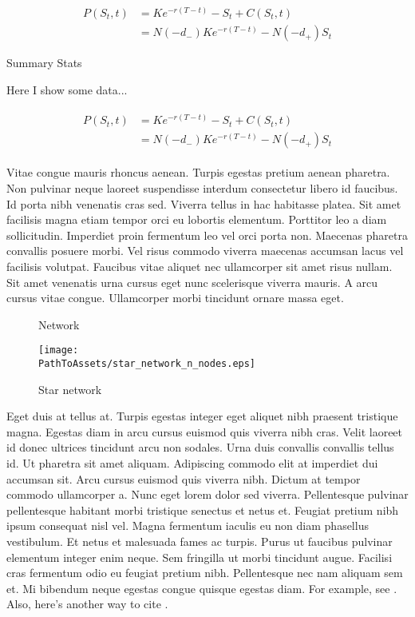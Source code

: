 \documentclass[12pt]{article}
\begin{document}
\begin{align}
P(S_t, t) &= Ke^{-r(T - t)} - S_t + C(S_t, t)   \label{eq:align1}\\
          &= N(-d_-) Ke^{-r(T - t)} - N(-d_+) S_t \label{eq:align2}
\end{align}



\begin{table}
\caption{Summary Stats}
\centering

\caption*{
  Here I show some data...
}
\label{table:example_table.tex}
\end{table}

\begin{align}
\begin{split}
P(S_t, t) &= Ke^{-r(T - t)} - S_t + C(S_t, t)   \\
          &= N(-d_-) Ke^{-r(T - t)} - N(-d_+) S_t 
\end{split}
\label{eq:align-share}
\end{align}



Vitae congue mauris rhoncus aenean. Turpis egestas pretium aenean pharetra.
Non pulvinar neque laoreet suspendisse interdum consectetur libero id
faucibus. Id porta nibh venenatis cras sed. Viverra tellus in hac habitasse
platea. Sit amet facilisis magna etiam tempor orci eu lobortis elementum.
Porttitor leo a diam sollicitudin. Imperdiet proin fermentum leo vel orci
porta non. Maecenas pharetra convallis posuere morbi. Vel risus commodo
viverra maecenas accumsan lacus vel facilisis volutpat. Faucibus vitae
aliquet nec ullamcorper sit amet risus nullam. Sit amet venenatis urna cursus
eget nunc scelerisque viverra mauris. A arcu cursus vitae congue. Ullamcorper
morbi tincidunt ornare massa eget.

\begin{figure}
\centering
\captionsetup{width=0.8\textwidth}
\caption{Network}
  \centering
  \texttt{[image: \\PathToAssets/star\_network\_n\_nodes.eps]}
\caption*{
  Star network
  }
\label{fig:star_network_n_nodes.eps}
\end{figure}


Eget duis at tellus at. Turpis egestas integer eget aliquet nibh praesent
tristique magna. Egestas diam in arcu cursus euismod quis viverra nibh cras.
Velit laoreet id donec ultrices tincidunt arcu non sodales. Urna duis
convallis convallis tellus id. Ut pharetra sit amet aliquam. Adipiscing
commodo elit at imperdiet dui accumsan sit. Arcu cursus euismod quis viverra
nibh. Dictum at tempor commodo ullamcorper a. Nunc eget lorem dolor sed
viverra. Pellentesque pulvinar pellentesque habitant morbi tristique senectus
et netus et. Feugiat pretium nibh ipsum consequat nisl vel. Magna fermentum
iaculis eu non diam phasellus vestibulum. Et netus et malesuada fames ac
turpis. Purus ut faucibus pulvinar elementum integer enim neque. Sem
fringilla ut morbi tincidunt augue. Facilisi cras fermentum odio eu feugiat
pretium nibh. Pellentesque nec nam aliquam sem et. Mi bibendum neque egestas
congue quisque egestas diam. For example, see \citet{fama1992cross}. Also, here's another
way to cite \citep{sharpe1964capital}.
\end{document}
